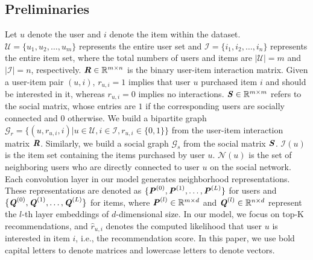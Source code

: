 \documentclass[letterpaper]{article} %
\begin{document}
\subsection{Preliminaries}
Let $u$ denote the user and $i$ denote the item within the dataset. $\mathcal{U}=\{u_1,  u_2, \ldots, u_m\}$ represents the entire user set and $\mathcal{I}=\{i_1, i_2, \ldots, i_n\}$ represents the entire item set, where the total numbers of users and items are $|\mathcal{U}|=m$ and $|\mathcal{I}|=n$, respectively. $\textbf{\textit{R}} \in \mathbb{R}^{m\times n}$ is the binary user-item interaction matrix. Given a user-item pair $(u, i)$, $r_{u,i}=1$ implies that user $u$ purchased item $i$ and should be interested in it, whereas $r_{u,i}=0$ implies no interactions. $\textbf{\textit{S}} \in \mathbb{R}^{m\times m}$ refers to the social matrix, whose entries are $1$ if the corresponding users are socially connected and $0$ otherwise. We build a bipartite graph $\mathcal{G}_r=\{(u, r_{u,i}, i)|u\in \mathcal{U}, i\in \mathcal{I}, r_{u,i}\in \{0,1\}\}$ from the user-item interaction matrix $\textbf{\textit{R}}$. Similarly, we build a social graph $\mathcal{G}_s$ from the social matrix $\textbf{\textit{S}}$. $\mathcal{I}(u)$ is the item set containing the items purchased by user $u$. $\mathcal{N}(u)$ is the set of neighboring users who are directly connected to user $u$ on the social network. Each convolution layer in our model generates neighborhood representations. These representations are denoted as $\{\textbf{\textit{P}}^{(0)}, \textbf{\textit{P}}^{(1)}, \ldots, \textbf{\textit{P}}^{(L)}\}$ for users and $\{\textbf{\textit{Q}}^{(0)}, \textbf{\textit{Q}}^{(1)}, \ldots, \textbf{\textit{Q}}^{(L)}\}$ for items, where $\textbf{\textit{P}}^{(l)} \in \mathbb{R}^{m\times d}$ and $\textbf{\textit{Q}}^{(l)} \in \mathbb{R}^{n\times d}$ represent the $l$-th layer embeddings of $d$-dimensional size. In our model, we focus on top-K recommendations, and $\hat{r}_{u, i}$ denotes the computed likelihood that user $u$ is interested in item $i$, i.e., the recommendation score. In this paper, we use bold capital letters to denote matrices and lowercase letters to denote vectors.
\end{document}
